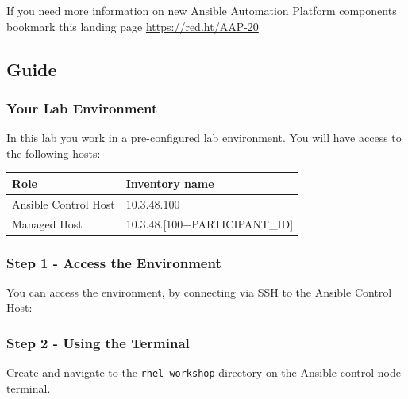 If you need more information on new Ansible Automation Platform
components bookmark this landing page \url{https://red.ht/AAP-20}

\hypertarget{guide}{%
\subsection{Guide}\label{guide}}

\hypertarget{your-lab-environment}{%
\subsubsection{Your Lab Environment}\label{your-lab-environment}}

In this lab you work in a pre-configured lab environment. You will have
access to the following hosts:

\begin{longtable}[]{@{}ll@{}}
\toprule\noalign{}
Role & Inventory name \\
\midrule\noalign{}
\endhead
\bottomrule\noalign{}
\endlastfoot
    Ansible Control Host & 10.3.48.100 \\
    Managed Host & 10.3.48.[100+PARTICIPANT\_ID] \\
\end{longtable}

\hypertarget{step-1---access-the-environment}{%
\subsubsection{Step 1 - Access the
Environment}\label{step-1---access-the-environment}}

You can access the environment, by connecting via SSH to the Ansible Control Host:


\begin{Highlighting}[]
\end{Highlighting}

\hypertarget{step-2---using-the-terminal}{%
\subsubsection{Step 2 - Using the
Terminal}\label{step-2---using-the-terminal}}

Create and navigate to the \texttt{rhel-workshop} directory on the Ansible control
node terminal.

\begin{Shaded}
\begin{Highlighting}[]
    \ExtensionTok{$}
    \ExtensionTok{$}
\end{Highlighting}
\end{Shaded}

